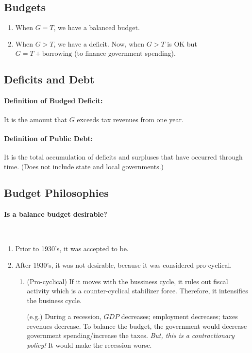 \subsection{Budgets}

\begin{enumerate}[label = \textbullet]
	\item When $G = T$, we have a balanced budget.
	\item When $G > T$, we have a deficit.
		Now, when $G > T$ is OK but $G = T + \text{borrowing}$ (to finance government spending).
\end{enumerate}

\subsection{Deficits and Debt}

\paragraph{Definition of Budged Deficit:} It is the amount that $G$ exceeds tax revenues from one year. 

\paragraph{Definition of Public Debt:} It is the total accumulation of deficits and surpluses that have occurred through time. (Does not include state and local governments.)

\subsection{Budget Philosophies}

\paragraph{Is a balance budget desirable?}\ 

\begin{enumerate}[label = \textbullet]
	\item Prior to 1930's, it was accepted to be.
	\item After 1930's, it was not desirable, because it was considered pro-cyclical.
		\begin{enumerate}[label = (\alph*)]
			\item (Pro-cyclical) If it moves with the bussiness cycle, it rules out fiscal activity which is a counter-cyclical stabilizer force. Therefore, it intensifies the business cycle.
			\item[(e.g.)] During a recession, $GDP$ decreases; employment decreases; taxes revenues decrease. To balance the budget, the government would decrease government spending/increase the taxes. \emph{But, this is a contractionary policy!} It would make the recession worse.
		\end{enumerate}
\end{enumerate}

